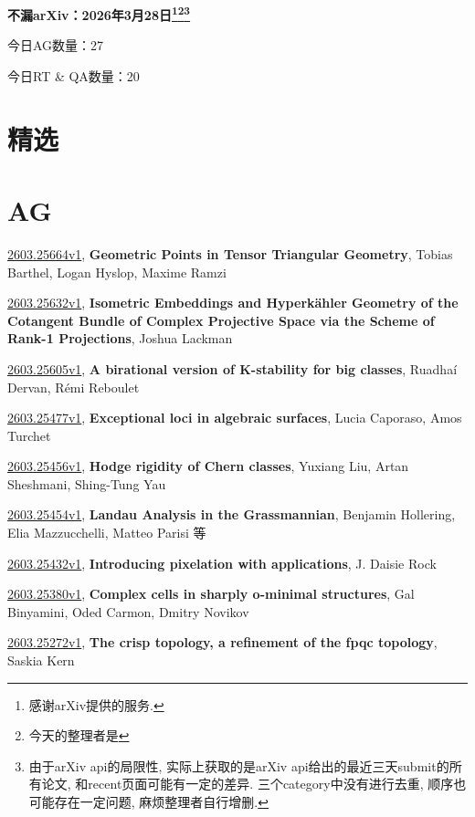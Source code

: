 \documentclass[9pt, a4paper]{article}
\theoremstyle{plain}
\theoremstyle{definition}
\theoremstyle{remark}
\newcommand{\arxiv}[3]{\href{https://arxiv.org/abs/#1}{#1}, \textbf{\textcolor{arxivblue}{#2}}, #3}
\newcommand{\AGnumber}{27}
\newcommand{\RTQAnumber}{20}
\newcommand{\NewestDate}{2026年3月28日}
\newcommand{\todayarXiver}{} %
\begin{document}
\begin{center}
    \Huge\textbf{不漏arXiv：\NewestDate\footnote{感谢arXiv提供的服务.}\footnote{今天的整理者是\todayarXiver}\footnote{由于arXiv api的局限性, 实际上获取的是arXiv api给出的最近三天submit的所有论文, 和recent页面可能有一定的差异. 三个category中没有进行去重, 顺序也可能存在一定问题, 麻烦整理者自行增删.}} \\
\end{center}

\setcounter{section}{-1}

\begin{center}
    今日AG数量：\AGnumber
    
    今日RT \& QA数量：\RTQAnumber
    
\end{center}


\section{精选}


\section{AG}
\arxiv{2603.25664v1}{Geometric Points in Tensor Triangular Geometry}{Tobias Barthel, Logan Hyslop, Maxime Ramzi}

\arxiv{2603.25632v1}{Isometric Embeddings and Hyperkähler Geometry of the Cotangent Bundle of Complex Projective Space via the Scheme of Rank-1 Projections}{Joshua Lackman}

\arxiv{2603.25605v1}{A birational version of K-stability for big classes}{Ruadhaí Dervan, Rémi Reboulet}

\arxiv{2603.25477v1}{Exceptional loci in algebraic surfaces}{Lucia Caporaso, Amos Turchet}

\arxiv{2603.25456v1}{Hodge rigidity of Chern classes}{Yuxiang Liu, Artan Sheshmani, Shing-Tung Yau}

\arxiv{2603.25454v1}{Landau Analysis in the Grassmannian}{Benjamin Hollering, Elia Mazzucchelli, Matteo Parisi 等}

\arxiv{2603.25432v1}{Introducing pixelation with applications}{J. Daisie Rock}

\arxiv{2603.25380v1}{Complex cells in sharply o-minimal structures}{Gal Binyamini, Oded Carmon, Dmitry Novikov}

\arxiv{2603.25272v1}{The crisp topology, a refinement of the fpqc topology}{Saskia Kern}
\end{document}
